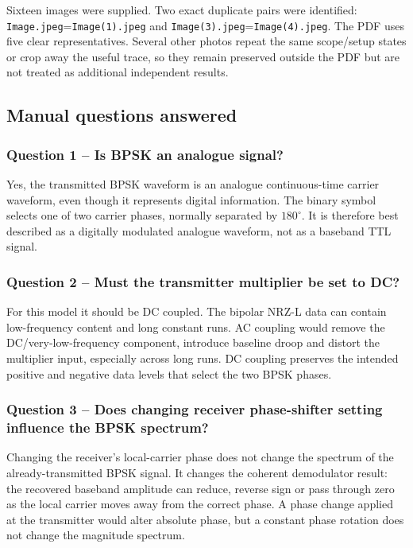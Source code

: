 \documentclass[11pt,a4paper]{article}
\begin{document}
\begin{evidencebox}
Sixteen images were supplied. Two exact duplicate pairs were identified: \texttt{Image.jpeg}=\texttt{Image(1).jpeg} and \texttt{Image(3).jpeg}=\texttt{Image(4).jpeg}. The PDF uses five clear representatives. Several other photos repeat the same scope/setup states or crop away the useful trace, so they remain preserved outside the PDF but are not treated as additional independent results.
\end{evidencebox}

\subsection{Manual questions answered}
\subsubsection*{Question 1 -- Is BPSK an analogue signal?}
\begin{answerbox}
Yes, the transmitted BPSK waveform is an analogue continuous-time carrier waveform, even though it represents digital information. The binary symbol selects one of two carrier phases, normally separated by $180^\circ$. It is therefore best described as a digitally modulated analogue waveform, not as a baseband TTL signal.
\end{answerbox}

\subsubsection*{Question 2 -- Must the transmitter multiplier be set to DC?}
\begin{answerbox}
For this model it should be DC coupled. The bipolar NRZ-L data can contain low-frequency content and long constant runs. AC coupling would remove the DC/very-low-frequency component, introduce baseline droop and distort the multiplier input, especially across long runs. DC coupling preserves the intended positive and negative data levels that select the two BPSK phases.
\end{answerbox}

\subsubsection*{Question 3 -- Does changing receiver phase-shifter setting influence the BPSK spectrum?}
\begin{answerbox}
Changing the receiver's local-carrier phase does not change the spectrum of the already-transmitted BPSK signal. It changes the coherent demodulator result: the recovered baseband amplitude can reduce, reverse sign or pass through zero as the local carrier moves away from the correct phase. A phase change applied at the transmitter would alter absolute phase, but a constant phase rotation does not change the magnitude spectrum.
\end{answerbox}
\end{document}
